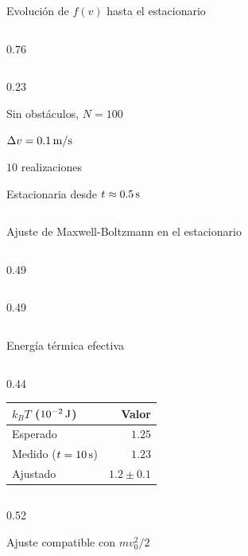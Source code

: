 
\begin{frame}{Evolución de $f(v)$ hasta el estacionario}
  \begin{cols}
    \begin{column}{0.76\textwidth}
    \end{column}
    \begin{column}{0.23\textwidth}
      \begin{parametros}
        \item Sin obstáculos, $N = 100$
        \item $\Delta v = 0.1\,\mathrm{m/s}$
        \item $10$ realizaciones
      \end{parametros}
      \begin{resultado}
        \item Estacionaria desde $t \approx 0.5\,\mathrm{s}$
      \end{resultado}
    \end{column}
  \end{cols}
\end{frame}

\begin{frame}{Ajuste de Maxwell-Boltzmann en el estacionario}
  \begin{cols}
    \begin{column}{0.49\textwidth}
    \end{column}
    \begin{column}{0.49\textwidth}
    \end{column}
  \end{cols}
  \vspace{2pt}
\end{frame}

\begin{frame}{Energía térmica efectiva}
  \vspace*{\fill}
  \begin{cols}
    \begin{column}{0.44\textwidth}
      \centering
      \begin{tabular}{lr}
        \hline
        $k_B T$ ($10^{-2}\,\mathrm{J}$) & Valor \\
        \hline
        Esperado                  & $1.25$ \\
        Medido ($t = 10\,\mathrm{s}$)  & $1.23$ \\
        Ajustado                  & $1.2 \pm 0.1$ \\
        \hline
      \end{tabular}
    \end{column}
    \begin{column}{0.52\textwidth}
      \begin{resultado}
        \item Ajuste compatible con $m v_0^2/2$
      \end{resultado}
    \end{column}
  \end{cols}
  \vspace*{\fill}
\end{frame}
